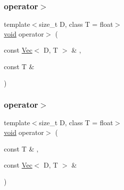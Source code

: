 \mbox{\label{classtrimesh_1_1Vec_afd9f6edbf4e133b4fe87d4720d09eb38}} 
\subsubsection{\texorpdfstring{operator$>$}{operator>}\hspace{0.1cm}{\footnotesize\ttfamily [1/2]}}
{\footnotesize\ttfamily template$<$size\+\_\+t D, class T = float$>$ \\
\hyperlink{namespacetrimesh_a784ddfd979e1c579bda795a8edfc3f43}{void} operator$>$ (\begin{DoxyParamCaption}\item[{const \hyperlink{classtrimesh_1_1Vec}{Vec}$<$ D, T $>$ \&}]{,  }\item[{const T \&}]{ }\end{DoxyParamCaption})\hspace{0.3cm}{\ttfamily [friend]}}

\mbox{\label{classtrimesh_1_1Vec_a45e1015472d8768338d62e67e791c8dc}} 
\subsubsection{\texorpdfstring{operator$>$}{operator>}\hspace{0.1cm}{\footnotesize\ttfamily [2/2]}}
{\footnotesize\ttfamily template$<$size\+\_\+t D, class T = float$>$ \\
\hyperlink{namespacetrimesh_a784ddfd979e1c579bda795a8edfc3f43}{void} operator$>$ (\begin{DoxyParamCaption}\item[{const T \&}]{,  }\item[{const \hyperlink{classtrimesh_1_1Vec}{Vec}$<$ D, T $>$ \&}]{ }\end{DoxyParamCaption})\hspace{0.3cm}{\ttfamily [friend]}}

\mbox{\label{classtrimesh_1_1Vec_a1a9335cea2eb49678d55dfd0a3c16de2}} 
